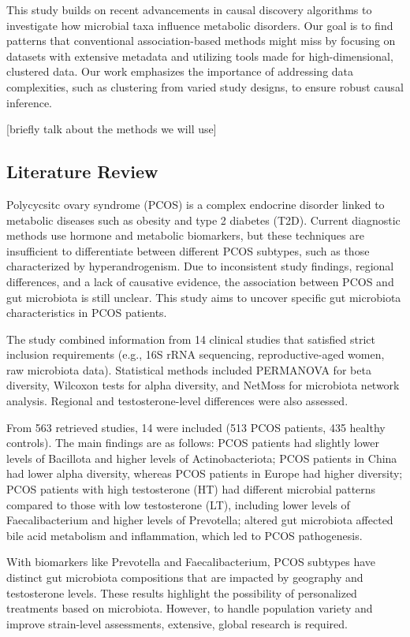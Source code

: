 \documentclass[12pt,letterpaper]{article}
\begin{document}
This study builds on recent advancements in causal discovery algorithms to investigate how microbial taxa influence metabolic disorders. Our goal is to find patterns that conventional association-based methods might miss by focusing on datasets with extensive metadata and utilizing tools made for high-dimensional, clustered data. Our work emphasizes the importance of addressing data complexities, such as clustering from varied study designs, to ensure robust causal inference.

[briefly talk about the methods we will use]


\subsection{Literature Review}
Polycycsitc ovary syndrome (PCOS) is a complex endocrine disorder linked to metabolic diseases such as obesity and type 2 diabetes (T2D). Current diagnostic methods use hormone and metabolic biomarkers, but these techniques are insufficient to differentiate between different PCOS subtypes, such as those characterized by hyperandrogenism. Due to inconsistent study findings, regional differences, and a lack of causative evidence, the association between PCOS and gut microbiota is still unclear. This study aims to uncover specific gut microbiota characteristics in PCOS patients.

The study combined information from 14 clinical studies that satisfied strict inclusion requirements (e.g., 16S rRNA sequencing, reproductive-aged women, raw microbiota data). Statistical methods included PERMANOVA for beta diversity, Wilcoxon tests for alpha diversity, and NetMoss for microbiota network analysis. Regional and testosterone-level differences were also assessed.

From 563 retrieved studies, 14 were included (513 PCOS patients, 435 healthy controls). The main findings are as follows: PCOS patients had slightly lower levels of Bacillota and higher levels of Actinobacteriota; PCOS patients in China had lower alpha diversity, whereas PCOS patients in Europe had higher diversity; PCOS patients with high testosterone (HT) had different microbial patterns compared to those with low testosterone (LT), including lower levels of Faecalibacterium and higher levels of Prevotella; altered gut microbiota affected bile acid metabolism and inflammation, which led to PCOS pathogenesis.

With biomarkers like Prevotella and Faecalibacterium, PCOS subtypes have distinct gut microbiota compositions that are impacted by geography and testosterone levels. These results highlight the possibility of personalized treatments based on microbiota. However, to handle population variety and improve strain-level assessments, extensive, global research is required.
\end{document}
